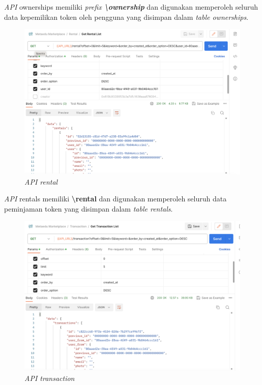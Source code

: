 \emph{API} ownerships memiliki \emph{prefix \textbf{\textbackslash ownership}} dan digunakan memperoleh seluruh data kepemilikan token oleh pengguna yang disimpan dalam \emph{table ownerships}. 

\begin{figure} [H] \centering
  \includegraphics[scale=0.3]{gambar/img-api-rentals.png}
  \caption{\emph{API rental} }
  \label{fig:APIRentals}
\end{figure}

\emph{API} rentals memiliki \textbf{\textbackslash rental} dan digunakan memperoleh seluruh data peminjaman token yang disimpan dalam \emph{table rentals}. 

\begin{figure} [H] \centering
  \includegraphics[scale=0.3]{gambar/img-api-transactions.png}
  \caption{\emph{API transaction} }
  \label{fig:APITransactions}
\end{figure}


